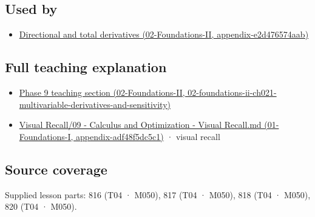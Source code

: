 \subsection{Used by}\label{appendix-677b59746ae0-used-by}

\begin{itemize}
\tightlist
\item
  \href{../02-Foundations-II/main.pdf\#nameddest=appendix-e2d476574aab}{Directional and total derivatives (02-Foundations-II, appendix-e2d476574aab)}
\end{itemize}

\subsection{Full teaching explanation}\label{appendix-677b59746ae0-full-teaching-explanation}

\begin{itemize}
\tightlist
\item
  \href{../02-Foundations-II/main.pdf\#nameddest=02-foundations-ii-ch021-multivariable-derivatives-and-sensitivity}{Phase 9 teaching section (02-Foundations-II, 02-foundations-ii-ch021-multivariable-derivatives-and-sensitivity)}
\item
  \href{../01-Foundations-I/main.pdf\#nameddest=appendix-adf48f5dc5c1}{Visual Recall/09 - Calculus and Optimization - Visual Recall.md (01-Foundations-I, appendix-adf48f5dc5c1)} · visual recall
\end{itemize}

\subsection{Source coverage}\label{appendix-677b59746ae0-source-coverage}

Supplied lesson parts: 816 (T04 · M050), 817 (T04 · M050), 818 (T04 · M050), 820 (T04 · M050).
